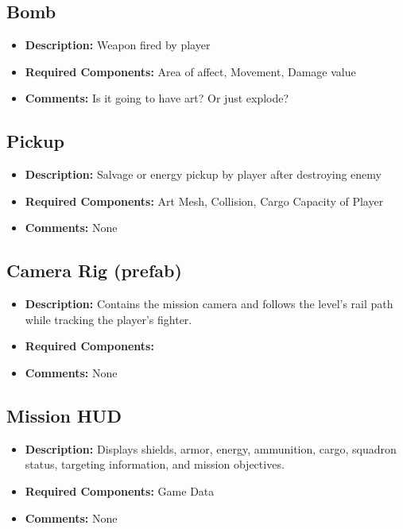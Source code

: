 \documentclass[journal]{IEEEtran}
\begin{document}
\subsection{Bomb}

\begin{itemize}
    \item \textbf{Description:} Weapon fired by player
    \item \textbf{Required Components: } Area of affect, Movement, Damage value
    \item \textbf{Comments: } Is it going to have art? Or just explode?
\end{itemize}

\subsection{Pickup}

\begin{itemize}
    \item \textbf{Description:} Salvage or energy pickup by player after destroying enemy
    \item \textbf{Required Components: } Art Mesh, Collision, Cargo Capacity of Player
    \item \textbf{Comments: } None
\end{itemize}

\subsection{Camera Rig (prefab)}

\begin{itemize}
    \item \textbf{Description:} Contains the mission camera and follows the level's rail path while tracking the player's fighter.
    \item \textbf{Required Components: } 
    \item \textbf{Comments: } None
\end{itemize}

\subsection{Mission HUD}

\begin{itemize}
    \item \textbf{Description:} Displays shields, armor, energy, ammunition, cargo, squadron status, targeting information, and mission objectives.
    \item \textbf{Required Components: } Game Data
    \item \textbf{Comments: } None
\end{itemize}
\end{document}
